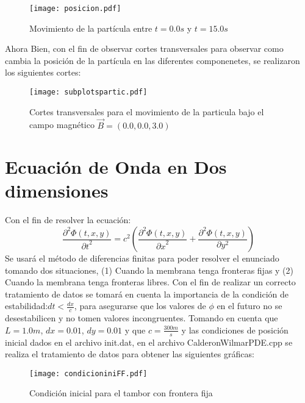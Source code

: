\documentclass[11pt,letterpaper]{exam}
\begin{document}
\begin{figure}[H]
\begin{center}
\texttt{[image: posicion.pdf]} 
\caption{\label{fig:typical}Movimiento de la part\'icula entre $t=0.0s$ y $t=15.0s$}
\end{center}
\end{figure}
Ahora Bien, con el fin de observar cortes transversales para observar como cambia la posici\'on de la part\'icula en las diferentes componenetes, se realizaron los siguientes cortes:
\begin{figure}[H]
\begin{center}
\texttt{[image: subplotspartic.pdf]} 
\caption{\label{fig:typical}Cortes transversales para el movimiento de la particula bajo el campo magn\'etico $\vec{B}=(0.0,0.0,3.0)$}
\end{center}
\end{figure}




\noindent
\section{Ecuaci\'on de Onda en Dos dimensiones}
Con el fin de resolver la ecuaci\'on:
\begin{equation}
\frac{{\partial}^2\Phi(t,x,y)}{{\partial t}^2}={c}^2(\frac{{\partial}^2\Phi(t,x,y)}{{\partial x}^2}+\frac{{\partial}^2\Phi(t,x,y)}{{\partial} y^2})
\end{equation}
Se usar\'a el m\'etodo de diferencias finitas para poder resolver el enunciado tomando dos situaciones, (1) Cuando la membrana tenga fronteras fijas y (2) Cuando la membrana tenga fronteras libres. Con el fin de realizar un correcto tratamiento de datos se tomar\'a en cuenta la importancia de la condici\'on de estabilidad:$dt<\frac{dx}{c}$, para asegurarse que los valores de $\phi$ en el futuro no se desestabilicen y no tomen valores incongruentes.
Tomando en cuenta que $L=1.0m$, $dx=0.01$, $dy=0.01$ y que $c=\frac{300m}{s}$ y las condiciones de posici\'on inicial dados en el archivo init.dat, en el archivo CalderonWilmarPDE.cpp se realiza el tratamiento de datos para obtener las siguientes gr\'aficas:   

\begin{figure}[H]
\begin{center}
\texttt{[image: condicioniniFF.pdf]} 
\caption{\label{fig:typical}Condici\'on inicial para el tambor con frontera fija}
\end{center}
\end{figure}
\end{document}
